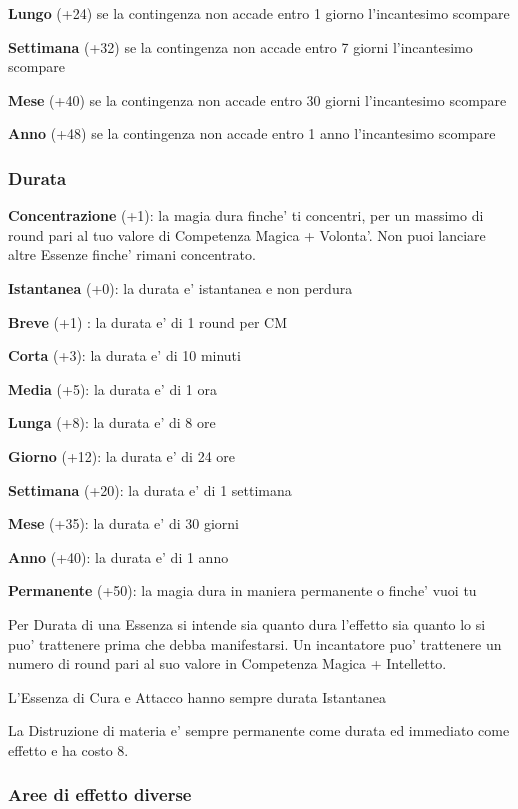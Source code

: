 \documentclass[a4paper,11pt,twoside,openany]{dndbook}
\begin{document}
\textbf{Lungo} (+24) se la contingenza non accade entro 1 giorno l'incantesimo scompare

\textbf{Settimana} (+32) se la contingenza non accade entro 7 giorni l'incantesimo scompare

\textbf{Mese} (+40) se la contingenza non accade entro 30 giorni l'incantesimo scompare

\textbf{Anno} (+48) se la contingenza non accade entro 1 anno l'incantesimo scompare

\subsubsection{Durata}

\label{durata}

\textbf{Concentrazione} (+1): la magia dura finche' ti concentri, per un massimo di round pari al tuo valore di Competenza Magica + Volonta'. Non puoi lanciare altre Essenze finche' rimani concentrato.

\textbf{Istantanea} (+0): la durata e' istantanea e non perdura

\textbf{Breve} (+1) : la durata e' di 1 round per CM

\textbf{Corta} (+3): la durata e' di 10 minuti

\textbf{Media} (+5): la durata e' di 1 ora

\textbf{Lunga} (+8): la durata e' di 8 ore

\textbf{Giorno} (+12): la durata e' di 24 ore

\textbf{Settimana} (+20): la durata e' di 1 settimana

\textbf{Mese} (+35): la durata e' di 30 giorni

\textbf{Anno} (+40): la durata e' di 1 anno

\textbf{Permanente} (+50): la magia dura in maniera permanente o finche' vuoi tu

Per Durata di una Essenza si intende sia quanto dura l'effetto sia quanto lo si puo' trattenere prima che debba manifestarsi. Un incantatore puo' trattenere un numero di round pari al suo valore in Competenza Magica + Intelletto.

L'Essenza di Cura e Attacco hanno sempre durata Istantanea

La Distruzione di materia e' sempre permanente come durata ed immediato come effetto e ha costo 8.

\subsubsection{Aree di effetto diverse}
\end{document}
